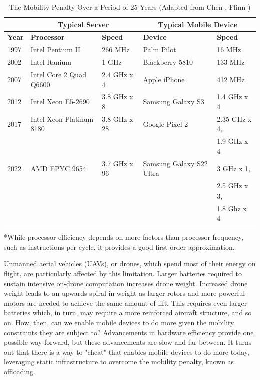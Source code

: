 \begin{table}[htbp]
    \centering
    \begin{tabular}{@{}lllll}
        \toprule & \multicolumn{2}{c}{\textbf{Typical Server}} & \multicolumn{2}{c}{\textbf{Typical Mobile Device}}\\\midrule
        \textbf{Year} & \textbf{Processor} & \textbf{Speed} & \textbf{Device} & \textbf{Speed}\\\midrule
        1997 & Intel Pentium II & 266 MHz & Palm Pilot & 16 MHz\\
        2002 & Intel Itanium & 1 GHz & Blackberry 5810 & 133 MHz\\
        2007 & Intel Core 2 Quad Q6600 & 2.4 GHz x 4 & Apple iPhone & 412 MHz\\
        2012 & Intel Xeon E5-2690 & 3.8 GHz x 8 & Samsung Galaxy S3 & 1.4 GHz x 4\\
        2017 & Intel Xeon Platinum 8180 & 3.8 GHz x 28 & Google Pixel 2 & 2.35 GHz x 4,\\
             &&&& 1.9 GHz x 4\\
        2022 & AMD EPYC 9654 & 3.7 GHz x 96 & Samsung Galaxy S22 Ultra & 3 GHz x 1,\\
             &&&& 2.5 GHz x 3,\\
             &&&& 1.8 Ghz x 4\\
        \bottomrule
    \end{tabular}
    \begin{captext}
        *While processor efficiency depends on more factors than processor frequency, such as instructions per cycle, it provides a good first-order approximation.
    \end{captext}
    \caption{The Mobility Penalty Over a Period of 25 Years (Adapted from Chen \cite{zchenthesis}, Flinn \cite{flinn2012cyber})}
    \label{tab:mobility-constraints}
\end{table}

Unmanned aerial vehicles (UAVs), or drones, which spend most of their energy on
flight, are particularly affected by this limitation. Larger batteries required
to sustain intensive on-drone computation increases drone weight.  Increased
drone weight leads to an upwards spiral in weight as larger rotors and more
powerful motors are needed to achieve the same amount of lift.  This requires
even larger batteries which, in turn, may require a more reinforced aircraft
structure, and so on. How, then, can we enable mobile devices to do more given
the mobility constraints they are subject to? Advancements in hardware
efficiency provide one possible way forward, but these advancements are slow
and far between. It turns out that there is a way to "cheat" that enables
mobile devices to do more today, leveraging static infrastructure to overcome
the mobility penalty, known as offloading.

